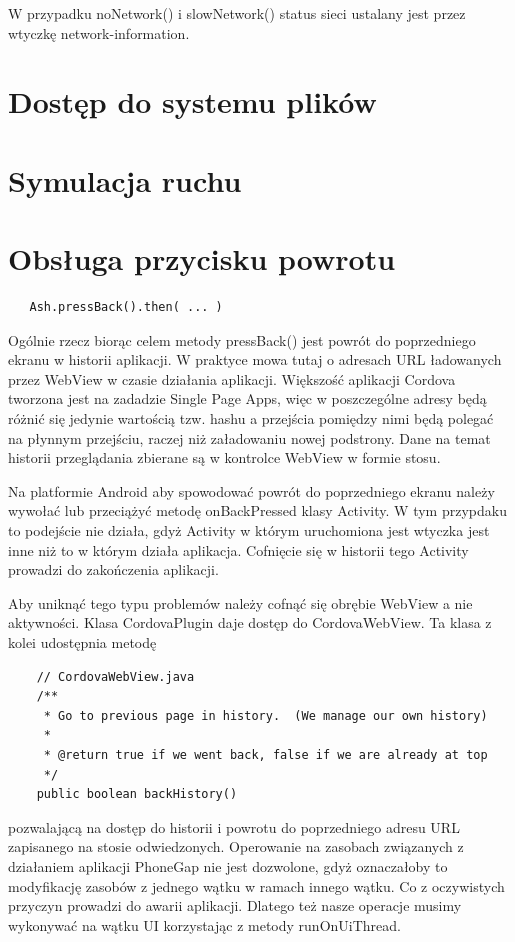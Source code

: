 \documentclass[brudnopis]{xmgr}
\begin{document}
W przypadku noNetwork() i slowNetwork() status sieci ustalany jest przez wtyczkę network-information.

\section{Dostęp do systemu plików}

\section{Symulacja ruchu}

\section{Obsługa przycisku powrotu}

\begin{lstlisting}
   Ash.pressBack().then( ... ) 
\end{lstlisting}

Ogólnie rzecz biorąc celem metody pressBack() jest powrót do poprzedniego ekranu w historii aplikacji. W praktyce mowa tutaj o adresach URL ładowanych przez WebView w czasie działania aplikacji. Większość aplikacji Cordova tworzona jest na zadadzie Single Page Apps, więc w poszczególne adresy będą różnić się jedynie wartością tzw. hashu a przejścia pomiędzy nimi będą polegać na płynnym przejściu, raczej niż załadowaniu nowej podstrony. Dane na temat historii przeglądania zbierane są w kontrolce WebView w formie stosu.

Na platformie Android aby spowodować powrót do poprzedniego ekranu należy wywołać lub przeciążyć metodę onBackPressed klasy Activity. W tym przypdaku to podejście nie działa, gdyż Activity w którym uruchomiona jest wtyczka jest inne niż to w którym działa aplikacja. Cofnięcie się w historii tego Activity prowadzi do zakończenia aplikacji. 

Aby uniknąć tego typu problemów należy cofnąć się obrębie WebView a nie aktywności. Klasa CordovaPlugin daje dostęp do CordovaWebView. Ta klasa z kolei udostępnia metodę 

\begin{lstlisting}
    // CordovaWebView.java
    /**
     * Go to previous page in history.  (We manage our own history)
     *
     * @return true if we went back, false if we are already at top
     */
    public boolean backHistory()
\end{lstlisting}

pozwalającą na dostęp do historii i powrotu do poprzedniego  adresu URL zapisanego na stosie odwiedzonych. Operowanie na zasobach związanych z działaniem aplikacji PhoneGap nie jest dozwolone, gdyż oznaczałoby to modyfikację zasobów z jednego wątku w ramach innego wątku. Co z oczywistych przyczyn prowadzi do awarii aplikacji. Dlatego też nasze operacje musimy wykonywać na wątku UI korzystając z metody runOnUiThread.
\end{document}
